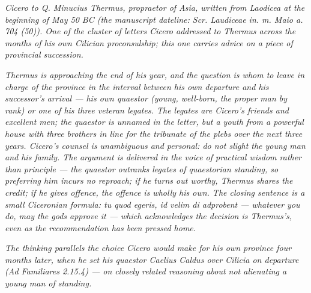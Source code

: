 
\textit{Cicero to Q. Minucius Thermus, propraetor of Asia, written
from Laodicea at the beginning of May 50 BC (the manuscript dateline:
\textit{Scr. Laudiceae in. m. Maio a. 704 (50)}). One of the cluster
of letters Cicero addressed to Thermus across the months of his own
Cilician proconsulship; this one carries advice on a piece of
provincial succession.}

\textit{Thermus is approaching the end of his year, and the question
is whom to leave in charge of the province in the interval between
his own departure and his successor's arrival --- his own quaestor
(young, well-born, the proper man by rank) or one of his three
veteran legates. The legates are Cicero's friends and excellent men;
the quaestor is unnamed in the letter, but a youth from a powerful
house with three brothers in line for the tribunate of the plebs over
the next three years. Cicero's counsel is unambiguous and personal:
do not slight the young man and his family. The argument is delivered
in the voice of practical wisdom rather than principle --- the quaestor
outranks legates of quaestorian standing, so preferring him incurs no
reproach; if he turns out worthy, Thermus shares the credit; if he
gives offence, the offence is wholly his own. The closing sentence is
a small Ciceronian formula: \textit{tu quod egeris, id velim di
adprobent} --- whatever you do, may the gods approve it --- which
acknowledges the decision is Thermus's, even as the recommendation
has been pressed home.}

\textit{The thinking parallels the choice Cicero would make for his
own province four months later, when he set his quaestor Caelius
Caldus over Cilicia on departure (\textit{Ad Familiares} 2.15.4) ---
on closely related reasoning about not alienating a young man of
standing.}
